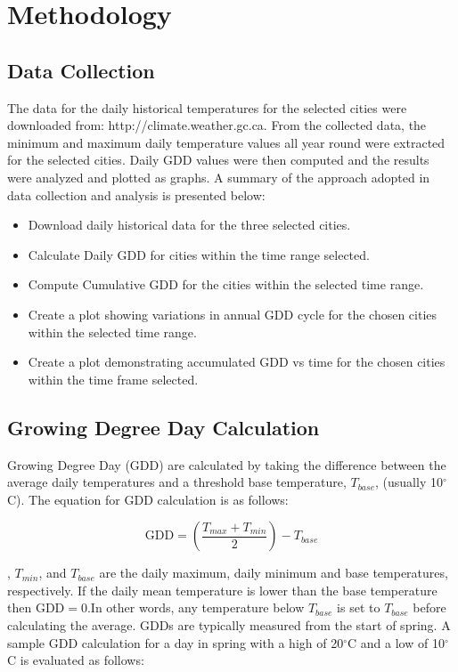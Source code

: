 \documentclass{article}
\begin{document}
\section{ \bf Methodology}
\subsection{Data Collection}
The data for the daily historical temperatures for the selected cities were downloaded from: http://climate.weather.gc.ca. From the collected data, the minimum and maximum daily temperature values all year round were extracted for the selected cities. Daily GDD values were then computed and the results were analyzed and plotted as graphs. A summary of the approach adopted in data collection and analysis is presented below:

\begin{itemize}
\item Download daily historical data for the three selected cities. 
\item Calculate Daily GDD for cities within the time range selected. 
\item Compute Cumulative GDD for the cities within the selected time range.
\item Create a plot showing variations in annual GDD cycle for the chosen cities within the selected time range. 
\item Create a plot demonstrating accumulated GDD vs time for the chosen cities within the time frame selected. 
\end{itemize}

\subsection{Growing Degree Day Calculation}
Growing Degree Day (GDD) are calculated by taking the difference between the average daily temperatures and a threshold base temperature, $T_{base}$, (usually 10$^{\circ}$C). The equation for GDD calculation is as follows: \vspace{5mm}

\begin{equation}
\textrm{GDD} = \left(\frac{T_{max} + T_{min}}{2}\right) - T_{base}
\end{equation}

, {$T_{min}$}, and {$T_{base}$} are the daily maximum, daily minimum and base temperatures, respectively. If the daily mean temperature is lower than the base temperature then $\textrm{GDD} = 0$.In other words, any temperature below $T_{base}$ is set to $T_{base}$ before calculating the average. GDDs are typically measured from the start of spring. A sample GDD calculation for a day in spring with a high of 20$^{\circ}$C and a low of 10$^{\circ}$C is evaluated as follows:\vspace{5mm}
\end{document}
